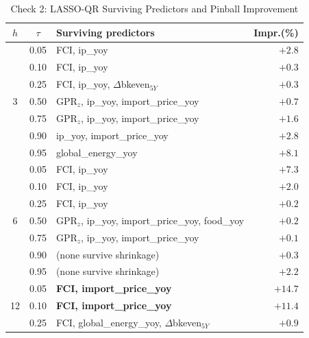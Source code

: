 \documentclass[12pt]{article}
\begin{document}
\begin{table}[htbp]\begin{center}
\caption{Check 2: LASSO-QR Surviving Predictors and Pinball Improvement}
\label{tab:lasso}
\begin{threeparttable}\small\setlength{\tabcolsep}{7pt}
\begin{tabular}{@{}cc>{\raggedright\arraybackslash}p{6.2cm}r@{}}
\toprule
$h$ & $\tau$ & Surviving predictors & Impr.(\%)\\
\midrule
\multirow{7}{*}{3}
 & 0.05 & FCI, ip\_yoy                                          & $+2.8$\\
 & 0.10 & FCI, ip\_yoy                                          & $+0.3$\\
 & 0.25 & FCI, ip\_yoy, $\Delta$bkeven$_{5Y}$                   & $+0.3$\\
 & 0.50 & GPR$_z$, ip\_yoy, import\_price\_yoy                  & $+0.7$\\
 & 0.75 & GPR$_z$, ip\_yoy, import\_price\_yoy                  & $+1.6$\\
 & 0.90 & ip\_yoy, import\_price\_yoy                           & $+2.8$\\
 & 0.95 & global\_energy\_yoy                                   & $+8.1$\\
\midrule
\multirow{7}{*}{6}
 & 0.05 & FCI, ip\_yoy                                          & $+7.3$\\
 & 0.10 & FCI, ip\_yoy                                          & $+2.0$\\
 & 0.25 & FCI, ip\_yoy                                          & $+0.2$\\
 & 0.50 & GPR$_z$, ip\_yoy, import\_price\_yoy, food\_yoy       & $+0.2$\\
 & 0.75 & GPR$_z$, ip\_yoy, import\_price\_yoy                  & $+0.1$\\
 & 0.90 & (none survive shrinkage)                              & $+0.3$\\
 & 0.95 & (none survive shrinkage)                              & $+2.2$\\
\midrule
\multirow{7}{*}{12}
 & \cellcolor{yellow!25}0.05 & \cellcolor{yellow!25}\textbf{FCI, import\_price\_yoy}  & \cellcolor{yellow!25}$\mathbf{+14.7}$\\
 & \cellcolor{yellow!25}0.10 & \cellcolor{yellow!25}\textbf{FCI, import\_price\_yoy}  & \cellcolor{yellow!25}$\mathbf{+11.4}$\\
 & 0.25 & FCI, global\_energy\_yoy, $\Delta$bkeven$_{5Y}$       & $+0.9$\\

\end{tabular}
\end{threeparttable}
\end{center}
\end{table}
\end{document}
